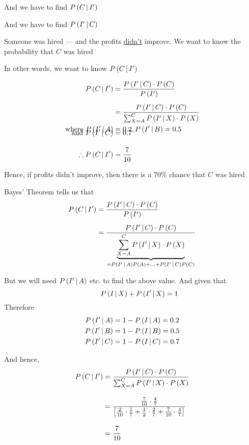 \documentclass[14pt,fleqn]{extarticle}
\newcommand\pa{\frac{1}{7}}
\newcommand\pb{\frac{2}{7}}
\newcommand\pc{\frac{4}{7}}
\begin{document}
\begin{problem}
\begin{step}
\begin{options}
      And we have to find $P\left(C\,\vert\,I'\right)$ 
     \incorrect
     
     And we have to find $P\left(I'\,\vert\,C\right)$ 
        
    \end{options} 
     \reason 
       
     Someone was hired --- and the profits \underline{didn't} improve. We want to know 
     the probability that $C$ was hired \newline 
     
     In other words, we want to know $P\left(C\,\vert\,I'\right)$    
\end{step}

\begin{step}
  \begin{options} 
     \correct 
      
      \begin{align}
	P\left(C\,\vert\,I'\right) &= \frac{P\left(I'\,\vert\,C\right)\cdot P\left(C\right)}{P\left(I'\right)} \\[5pt]
	&= \dfrac{P\left(I'\,\vert\,C\right)\cdot P\left( C\right)}{\sum_{X = A}^C P\left(I'\,\vert\,X\right)\cdot P\left( X\right)} \\
	\text{where } P\left(I'\,\vert\,A\right) &= 0.2, P\left(I'\,\vert\,B\right) = 0.5 \\[-10pt]
	\text{and }P\left(I'\,\vert\,C\right) &= 0.7  \\[10pt]
	\therefore P\left(C\,\vert\,I'\right) &= \frac{7}{10} 
\end{align} 

Hence, if profits didn't improve, then there is a $70\%$ chance that $C$ was hired 
     
    \end{options} 
     \reason 
     
     Bayes' Theorem tells us that 
     \begin{align}
     P\left(C\,\vert\,I'\right) &= \frac{P\left(I'\,\vert\,C\right)\cdot P\left(C\right)}{P\left(I'\right)} \\[5pt]
     &= \dfrac{P\left(I'\,\vert\,C\right)\cdot P\left( C\right)}{\underbrace{\sum_{X=A}^CP\left(I'\,\vert\,X\right)\cdot P\left( X\right)}_{=P\left(I'\,\vert\,A\right)P\left( A\right) + \ldots + P\left(I'\,\vert\,C\right)P\left( C\right)}}
\end{align}

But we will need $P\left(I'\,\vert\,A\right)$ etc. to find the above value. And given that 
\[ \qquad P\left(I\,\vert\,X\right) + P\left(I'\,\vert\,X\right) = 1 \] 
Therefore
\begin{align}
P\left(I'\,\vert\,A\right) &= 1-P\left(I\,\vert\,A\right) = 0.2 \\
P\left(I'\,\vert\,B\right) &= 1-P\left(I\,\vert\,B\right) = 0.5 \\
P\left(I'\,\vert\,C\right) &= 1-P\left(I\,\vert\,C\right) = 0.7 
\end{align}

And hence, 
\begin{align}
\condp{C}{I'} &= \dfrac{\condp{I'}{C}\cdot\prob{C}}{\sum_{X=A}^C\condp{I'}{X}\cdot\prob{X}} \\[10pt]
&= \dfrac{\frac{7}{10}\cdot\pc}{\left[\frac{2}{10}\cdot\pa + \frac{1}{2}\cdot\pb + \frac{7}{10}\cdot\pc \right]} \\[10pt]
&= \frac{7}{10} 
\end{align}
       
\end{step}
\end{problem} 
\end{document}
